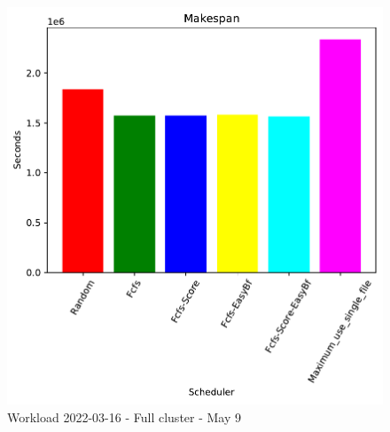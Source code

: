 \begin{figure}[H]
	\begin{minipage}[b]{0.5\linewidth}\centering\includegraphics[width=1\linewidth]{MBSS/plot/2022-03-16_Makespan450_128_32_256_4_1024.pdf}\caption{Makespan}\vspace{4ex}\end{minipage}\caption{Workload 2022-03-16 - Full cluster - May 9}\end{figure}
